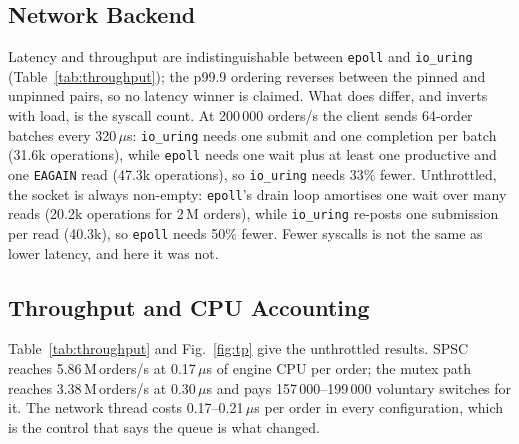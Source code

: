 \documentclass[conference]{IEEEtran}
\newcommand{\us}{\,$\mu$s}
\newcommand{\Mops}{\,M\,orders/s}
\begin{document}
\subsection{Network Backend}
Latency and throughput are indistinguishable between \texttt{epoll} and
\texttt{io\_uring} (Table~\ref{tab:throughput}); the p99.9 ordering reverses
between the pinned and unpinned pairs, so no latency winner is claimed. What does
differ, and inverts with load, is the syscall count. At 200\,000 orders/s the
client sends 64-order batches every 320\us: \texttt{io\_uring} needs one submit
and one completion per batch (31.6k operations), while \texttt{epoll} needs one
wait plus at least one productive and one \texttt{EAGAIN} read (47.3k
operations), so \texttt{io\_uring} needs 33\% fewer. Unthrottled, the socket is
always non-empty: \texttt{epoll}'s drain loop amortises one wait over many reads
(20.2k operations for 2\,M orders), while \texttt{io\_uring} re-posts one
submission per read (40.3k), so \texttt{epoll} needs 50\% fewer. Fewer syscalls
is not the same as lower latency, and here it was not.

\subsection{Throughput and CPU Accounting}
Table~\ref{tab:throughput} and Fig.~\ref{fig:tp} give the unthrottled results.
SPSC reaches 5.86\Mops{} at 0.17\us{} of engine CPU per order; the mutex path
reaches 3.38\Mops{} at 0.30\us{} and pays 157\,000--199\,000 voluntary switches
for it. The network thread costs 0.17--0.21\us{} per order in every
configuration, which is the control that says the queue is what changed.
\end{document}
